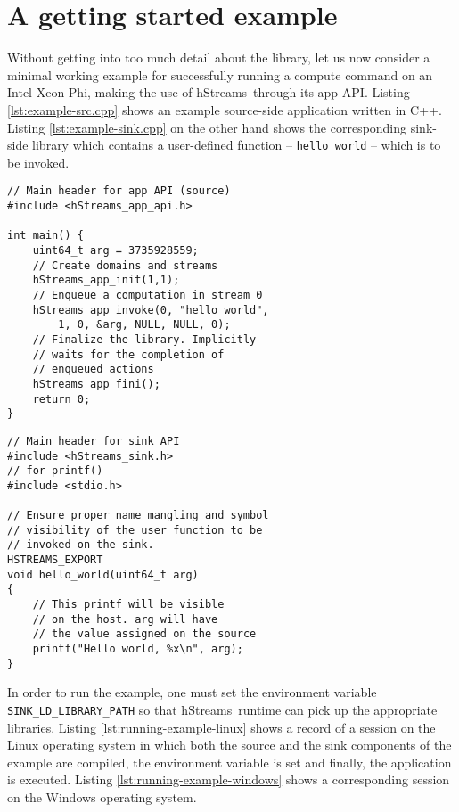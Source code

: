 \documentclass[a4,oneside]{book}
\newcommand{\ixp}{Intel\textregistered{} Xeon Phi\texttrademark{}}
\newcommand{\hstreams}{hStreams}
\begin{document}
\section{A getting started example}\label{sec:getting-started-example}
Without getting into too much detail about the library, let us now consider a minimal working example for successfully running a compute command on an \ixp, making the use of \hstreams\ through its app API.
Listing \ref{lst:example-src.cpp} shows an example source-side application written in C++.
Listing \ref{lst:example-sink.cpp} on the other hand shows the corresponding sink-side library which contains a user-defined function -- \texttt{hello\_world} -- which is to be invoked.

\noindent\begin{minipage}{.45\textwidth}
\begin{lstlisting}[style=CppListingStyle,caption=example\_src.cpp,label={lst:example-src.cpp}]
// Main header for app API (source)
#include <hStreams_app_api.h>

int main() {
    uint64_t arg = 3735928559;
    // Create domains and streams
    hStreams_app_init(1,1);
    // Enqueue a computation in stream 0
    hStreams_app_invoke(0, "hello_world",
        1, 0, &arg, NULL, NULL, 0);
    // Finalize the library. Implicitly
    // waits for the completion of
    // enqueued actions
    hStreams_app_fini();
    return 0;
}
\end{lstlisting}
\end{minipage}\hfill
\begin{minipage}{.45\textwidth}
\begin{lstlisting}[style=CppListingStyle,caption=example\_sink.cpp,label={lst:example-sink.cpp}]
// Main header for sink API
#include <hStreams_sink.h>
// for printf()
#include <stdio.h>

// Ensure proper name mangling and symbol
// visibility of the user function to be
// invoked on the sink.
HSTREAMS_EXPORT
void hello_world(uint64_t arg)
{
    // This printf will be visible
    // on the host. arg will have
    // the value assigned on the source
    printf("Hello world, %x\n", arg);
}
\end{lstlisting}
\end{minipage}

In order to run the example, one must set the environment variable \texttt{SINK\_LD\_LIBRARY\_PATH} so that \hstreams\ runtime can pick up the appropriate libraries.
Listing \ref{lst:running-example-linux} shows a record of a session on the Linux operating system in which both the source and the sink components of the example are compiled, the environment variable is set and finally, the application is executed.
Listing \ref{lst:running-example-windows} shows a corresponding session on the Windows operating system.
\end{document}
